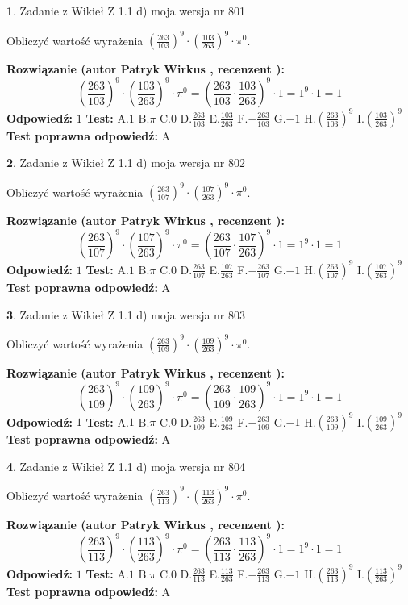 \documentclass[12pt, a4paper]{article}
\theoremstyle{definition} %
\newtheorem{zad}{}
\newcommand{\zadStart}[1]{\begin{zad}#1\newline}
\newcommand{\zadStop}{\end{zad}}
\newcommand{\rozwStart}[2]{\noindent \textbf{Rozwiązanie (autor #1 , recenzent #2): }\newline}
\newcommand{\rozwStop}{\newline}
\newcommand{\odpStart}{\noindent \textbf{Odpowiedź:}\newline}
\newcommand{\odpStop}{\newline}
\newcommand{\testStart}{\noindent \textbf{Test:}\newline}
\newcommand{\testStop}{\newline}
\newcommand{\kluczStart}{\noindent \textbf{Test poprawna odpowiedź:}\newline}
\newcommand{\kluczStop}{\newline}
\begin{document}
\zadStart{Zadanie z Wikieł Z 1.1 d) moja wersja nr 801}

Obliczyć wartość wyrażenia $(\frac{263}{103})^{9} \cdot (\frac{103}{263})^{9} \cdot \pi^{0}$.
\zadStop
\rozwStart{Patryk Wirkus}{}
$$(\frac{263}{103})^{9} \cdot (\frac{103}{263})^{9} \cdot \pi^{0} = (\frac{263}{103} \cdot \frac{103}{263})^{9} \cdot 1 = 1^{9} \cdot 1 = 1$$
\rozwStop
\odpStart
$1$
\odpStop
\testStart
A.$1$ B.$\pi$ C.$0$ D.$\frac{263}{103}$ E.$\frac{103}{263}$
F.$-\frac{263}{103}$ G.$-1$
H.$(\frac{263}{103})^{9}$
I.$(\frac{103}{263})^{9}$
\testStop
\kluczStart
A
\kluczStop



\zadStart{Zadanie z Wikieł Z 1.1 d) moja wersja nr 802}

Obliczyć wartość wyrażenia $(\frac{263}{107})^{9} \cdot (\frac{107}{263})^{9} \cdot \pi^{0}$.
\zadStop
\rozwStart{Patryk Wirkus}{}
$$(\frac{263}{107})^{9} \cdot (\frac{107}{263})^{9} \cdot \pi^{0} = (\frac{263}{107} \cdot \frac{107}{263})^{9} \cdot 1 = 1^{9} \cdot 1 = 1$$
\rozwStop
\odpStart
$1$
\odpStop
\testStart
A.$1$ B.$\pi$ C.$0$ D.$\frac{263}{107}$ E.$\frac{107}{263}$
F.$-\frac{263}{107}$ G.$-1$
H.$(\frac{263}{107})^{9}$
I.$(\frac{107}{263})^{9}$
\testStop
\kluczStart
A
\kluczStop



\zadStart{Zadanie z Wikieł Z 1.1 d) moja wersja nr 803}

Obliczyć wartość wyrażenia $(\frac{263}{109})^{9} \cdot (\frac{109}{263})^{9} \cdot \pi^{0}$.
\zadStop
\rozwStart{Patryk Wirkus}{}
$$(\frac{263}{109})^{9} \cdot (\frac{109}{263})^{9} \cdot \pi^{0} = (\frac{263}{109} \cdot \frac{109}{263})^{9} \cdot 1 = 1^{9} \cdot 1 = 1$$
\rozwStop
\odpStart
$1$
\odpStop
\testStart
A.$1$ B.$\pi$ C.$0$ D.$\frac{263}{109}$ E.$\frac{109}{263}$
F.$-\frac{263}{109}$ G.$-1$
H.$(\frac{263}{109})^{9}$
I.$(\frac{109}{263})^{9}$
\testStop
\kluczStart
A
\kluczStop



\zadStart{Zadanie z Wikieł Z 1.1 d) moja wersja nr 804}

Obliczyć wartość wyrażenia $(\frac{263}{113})^{9} \cdot (\frac{113}{263})^{9} \cdot \pi^{0}$.
\zadStop
\rozwStart{Patryk Wirkus}{}
$$(\frac{263}{113})^{9} \cdot (\frac{113}{263})^{9} \cdot \pi^{0} = (\frac{263}{113} \cdot \frac{113}{263})^{9} \cdot 1 = 1^{9} \cdot 1 = 1$$
\rozwStop
\odpStart
$1$
\odpStop
\testStart
A.$1$ B.$\pi$ C.$0$ D.$\frac{263}{113}$ E.$\frac{113}{263}$
F.$-\frac{263}{113}$ G.$-1$
H.$(\frac{263}{113})^{9}$
I.$(\frac{113}{263})^{9}$
\testStop
\kluczStart
A
\kluczStop
\end{document}
